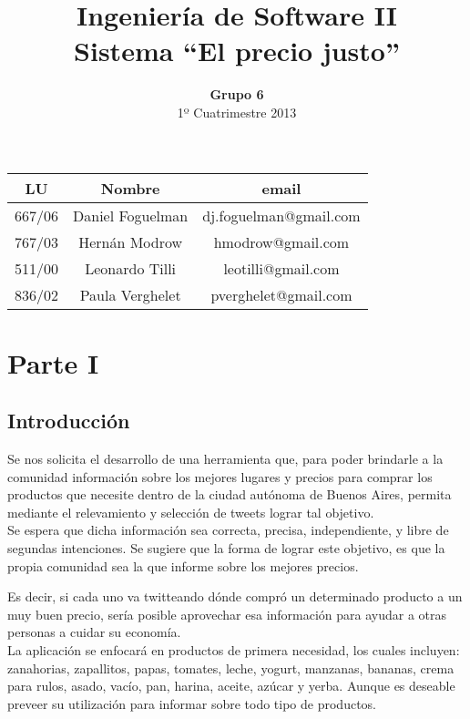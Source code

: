 \documentclass[a4paper,8pt]{article}
\title{Ingeniería de Software II\\ \textbf{Sistema ``El precio justo''}}
\author{\textbf{Grupo 6}\\ 1º Cuatrimestre 2013}
\date{}
\begin{document}
\maketitle
\vspace{10cm}
\begin{center}

\begin{tabular}{|c|c|c|}
\hline
\hline
\textbf{LU}&\textbf{Nombre}&\textbf{email}\\
\hline
667/06&Daniel Foguelman &dj.foguelman@gmail.com\\
\hline
767/03&Hernán Modrow&hmodrow@gmail.com\\
\hline
511/00&Leonardo Tilli&leotilli@gmail.com\\
\hline
836/02&Paula Verghelet&pverghelet@gmail.com\\
\hline
\hline
\end{tabular}
\end{center}
\newpage

\section{Parte I}
\subsection{Introducción}
Se nos solicita el desarrollo de una herramienta que, para poder brindarle a la comunidad información sobre los mejores lugares y precios para comprar los productos que necesite dentro de la ciudad autónoma de Buenos Aires, permita mediante el relevamiento y selección de tweets lograr tal objetivo. \\

Se espera que dicha información sea correcta, precisa, independiente, y libre de segundas intenciones. Se sugiere que la forma de lograr este objetivo, es que la propia comunidad sea la que informe sobre los mejores precios.

Es decir, si cada uno va twitteando dónde compró un determinado producto a un muy
buen precio, sería posible aprovechar esa información para ayudar a otras personas a cuidar su economía.\\

La aplicación se enfocará en productos de primera necesidad, los cuales incluyen: zanahorias, zapallitos, papas, tomates, leche, yogurt,
manzanas, bananas, crema para rulos, asado, vacío, pan, harina, aceite, azúcar y yerba. Aunque es deseable preveer su utilización para informar sobre todo tipo de productos. \\
\end{document}
